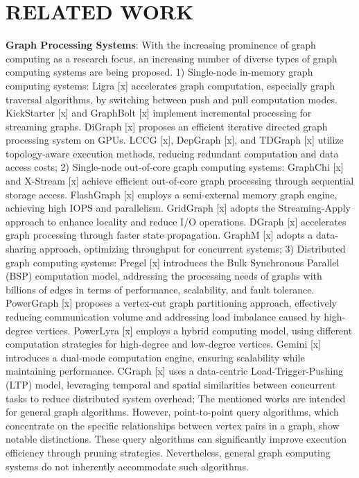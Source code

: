 \documentclass[lettersize,journal]{IEEEtran} %
\begin{document}
\section{RELATED WORK}
{\bf{Graph Processing Systems}}: With the increasing prominence of graph computing as a research focus, an increasing number of diverse types of graph computing systems are being proposed. 1) Single-node in-memory graph computing systems: Ligra [x] accelerates graph computation, especially graph traversal algorithms, by switching between push and pull computation modes. KickStarter [x] and GraphBolt [x] implement incremental processing for streaming graphs. DiGraph [x] proposes an efficient iterative directed graph processing system on GPUs. LCCG [x], DepGraph [x], and TDGraph [x] utilize topology-aware execution methods, reducing redundant computation and data access costs; 2) Single-node out-of-core graph computing systems: GraphChi [x] and X-Stream [x] achieve efficient out-of-core graph processing through sequential storage access. FlashGraph [x] employs a semi-external memory graph engine, achieving high IOPS and parallelism. GridGraph [x] adopts the Streaming-Apply approach to enhance locality and reduce I/O operations. DGraph [x] accelerates graph processing through faster state propagation. GraphM [x] adopts a data-sharing approach, optimizing throughput for concurrent systems; 3) Distributed graph computing systems: Pregel [x] introduces the Bulk Synchronous Parallel (BSP) computation model, addressing the processing needs of graphs with billions of edges in terms of performance, scalability, and fault tolerance. PowerGraph [x] proposes a vertex-cut graph partitioning approach, effectively reducing communication volume and addressing load imbalance caused by high-degree vertices. PowerLyra [x] employs a hybrid computing model, using different computation strategies for high-degree and low-degree vertices. Gemini [x] introduces a dual-mode computation engine, ensuring scalability while maintaining performance. CGraph [x] uses a data-centric Load-Trigger-Pushing (LTP) model, leveraging temporal and spatial similarities between concurrent tasks to reduce distributed system overhead; The mentioned works are intended for general graph algorithms. However, point-to-point query algorithms, which concentrate on the specific relationships between vertex pairs in a graph, show notable distinctions. These query algorithms can significantly improve execution efficiency through pruning strategies. Nevertheless, general graph computing systems do not inherently accommodate such algorithms.
\end{document}
